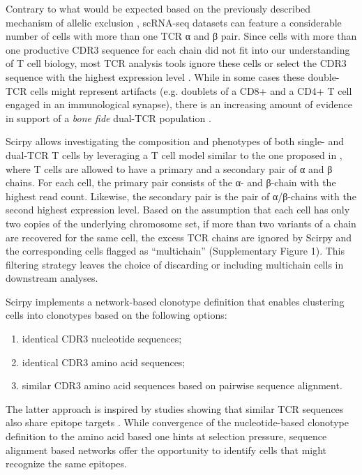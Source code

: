 \documentclass{article}
\begin{document}
Contrary to what would be expected based on the previously described mechanism of allelic exclusion \cite{Brady2010-gh}, scRNA-seq datasets can feature a considerable number of cells with more than one TCR α and β pair. Since cells with more than one productive CDR3 sequence for each chain did not fit into our understanding of T cell biology, most TCR analysis tools ignore these cells \cite{Fischer_undated-cx, Zhang2018-ip} or select the CDR3 sequence with the highest expression level \cite{Afik2017-sg}. While in some cases these double-TCR cells might represent artifacts (e.g. doublets of a CD8+ and a CD4+ T cell engaged in an immunological synapse), there is an increasing amount of evidence in support of a \textit{bone fide} dual-TCR population \cite{Schuldt2019-ey, Ji2010-bn}. \par

Scirpy allows investigating the composition and phenotypes of both single- and dual-TCR T cells by leveraging a T cell model similar to the one proposed in \cite{Stubbington2016-kh}, where T cells are allowed to have a primary and a secondary pair of α and β chains. For each cell, the primary pair consists of the α- and β-chain with the highest read count. Likewise, the secondary pair is the pair of α/β-chains with the second highest expression level. Based on the assumption that each cell has only two copies of the underlying chromosome set, if more than two variants of a chain are recovered for the same cell, the excess TCR chains are ignored by Scirpy and the corresponding cells flagged as “multichain” (Supplementary Figure 1). This filtering strategy leaves the choice of discarding or including multichain cells in downstream analyses.\par

Scirpy implements a network-based clonotype definition that enables clustering cells into clonotypes based on the following options:
\begin{enumerate}[label=(\alph*)]
    \item identical CDR3 nucleotide sequences;
    \item identical CDR3 amino acid sequences;
    \item similar CDR3 amino acid sequences based on pairwise sequence alignment. 
\end{enumerate}

The latter approach is inspired by studies showing that similar TCR sequences also share epitope targets \cite{Glanville2017-ay, Dash2017-xt, Fischer_undated-cx}. While convergence of the nucleotide-based clonotype definition to the amino acid based one hints at selection pressure, sequence alignment based networks offer the opportunity to identify cells that might recognize the same epitopes.\par

\newpage

\printbibliography[title={Supplementary References}]
\end{document}

